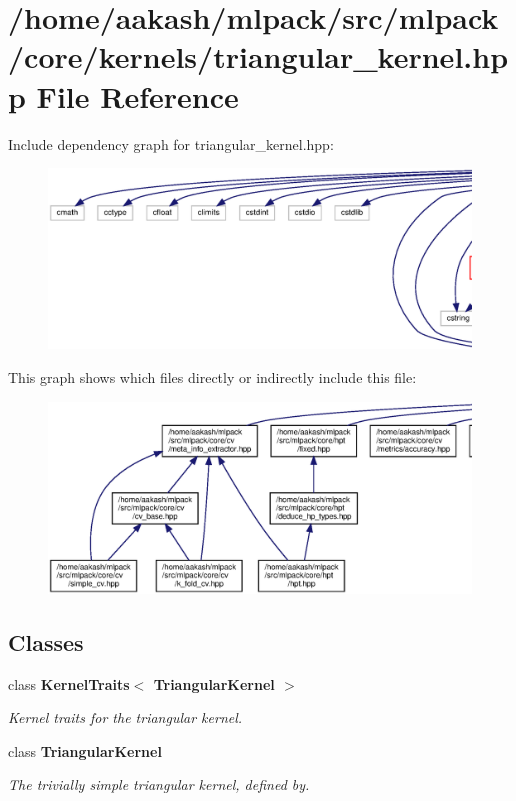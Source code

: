 \section{/home/aakash/mlpack/src/mlpack/core/kernels/triangular\+\_\+kernel.hpp File Reference}
\label{triangular__kernel_8hpp}
Include dependency graph for triangular\+\_\+kernel.\+hpp\+:
\nopagebreak
\begin{figure}[H]
\begin{center}
\leavevmode
\includegraphics[width=350pt]{triangular__kernel_8hpp__incl}
\end{center}
\end{figure}
This graph shows which files directly or indirectly include this file\+:
\nopagebreak
\begin{figure}[H]
\begin{center}
\leavevmode
\includegraphics[width=350pt]{triangular__kernel_8hpp__dep__incl}
\end{center}
\end{figure}
\subsection*{Classes}
\begin{DoxyCompactItemize}
\item 
class \textbf{ Kernel\+Traits$<$ Triangular\+Kernel $>$}
\begin{DoxyCompactList}\small\item\em Kernel traits for the triangular kernel. \end{DoxyCompactList}\item 
class \textbf{ Triangular\+Kernel}
\begin{DoxyCompactList}\small\item\em The trivially simple triangular kernel, defined by. \end{DoxyCompactList}\end{DoxyCompactItemize}
